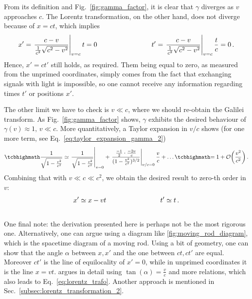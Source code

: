 \documentclass[../relativity_main.tex]{subfiles}
\begin{document}
From its definition and Fig.~\ref{fig:gamma_factor}, it is clear that $\gamma$ diverges as $v$ approaches $c$. The Lorentz transformation, on the other hand, does not diverge because of $x = ct$, which implies
\begin{align*}
	x' = \eval{\frac{c - v}{\frac{1}{c^2} \sqrt{c^2 - v^2}}}_{v = c} t = 0
	\manyqquad
	t' = \eval{\frac{c - v}{\frac{1}{c^2} \sqrt{c^2 - v^2}}}_{v = c} \frac{t}{c} = 0 \, .
\end{align*}
Hence, $x' = ct'$ still holds, as required. Them being equal to zero, as measured from the unprimed coordinates, simply comes from the fact that exchanging signals with light is impossible, so one cannot receive any information regarding times $t'$ or positions $x'$.


The other limit we have to check is $v \ll c$, where we should re-obtain the Galilei transform. As Fig.~\ref{fig:gamma_factor} shows, $\gamma$ exhibits the desired behaviour of $\gamma(v) \approx 1, \, v \ll c$. More quantitatively, a Taylor expansion in $v / c$ shows (for one more term, see Eq.~\eqref{eq:taylor_expansion_gamma_2})
\begin{equation}\label{eq:taylor_expansion_gamma}
	\eqbox{\frac{1}{\sqrt{1 - \frac{v^2}{c^2}}}} \simeq \eval{\frac{1}{\sqrt{1 - \frac{v^2}{c^2}}}}_{v = 0} + \eval{\frac{\frac{-1}{2} \cdot \frac{-2 v}{c}}{(1 - \frac{v^2}{c^2})^{3/2}}}_{v / c = 0} \frac{v}{c} + \dots \eqbox{= 1 + \mathcal{O}\qty(\frac{v^2}{c^2})} \, .
\end{equation}
Combining that with $v \ll c \ll c^2$, we obtain the desired result to zero-th order in $v$:
\begin{equation*}
	x' \simeq x - vt
	\qquad \qquad \qquad \qquad
	t' \simeq t
	\, .
\end{equation*}\\



One final note: the derivation presented here is perhaps not be the most rigorous one. Alternatively, one can argue using a diagram like \ref{fig:moving_rod_diagram}, which is the spacetime diagram of a moving rod. Using a bit of geometry, one can show that the angle $\alpha$ between $x, x'$ and the one between $ct, ct'$ are equal. Moreover $ct'$ is the line of equilocality of $x' = 0$, while in unprimed coordinates it is the line $x = vt$. \cite{giulini_srt} argues in detail using $\tan(\alpha) = \frac{v}{c}$ and more relations, which also leads to Eq.~\eqref{eq:lorentz_trafo}. Another approach is mentioned in Sec.~\ref{subsec:lorentz_transformation_2}.
\end{document}
